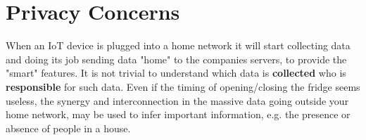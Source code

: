 \section{Privacy Concerns}
When an IoT device is plugged into a home network it
will start collecting data and doing its job sending data "home" to the companies servers,
to provide the "smart" features.
It is not trivial to understand which data is \textbf{collected} who is \textbf{responsible} for such data.
Even if the timing of opening/closing the fridge seems useless,
the synergy and interconnection in the massive data going outside your home network,
may be used to infer important information,
e.g. the presence or absence of people in a house.

